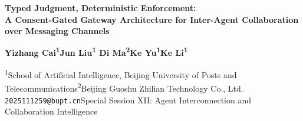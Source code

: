 \documentclass[19pt]{extarticle}
\begin{document}

\vspace*{2mm}
\begin{center}
  {\fontsize{46}{52}\selectfont\bfseries\color{teal}
   Typed Judgment, Deterministic Enforcement:\\[1mm]
   A Consent-Gated Gateway Architecture for Inter-Agent Collaboration over Messaging Channels}

  \vspace{5mm}
  {\Large\color{ink}\bfseries
   Yizhang Cai\textsuperscript{1}\quad Jun Liu\textsuperscript{1}\quad
   Di Ma\textsuperscript{2}\quad Ke Yu\textsuperscript{1}\quad Ke Li\textsuperscript{1}}

  \vspace{3mm}
  \begin{tcolorbox}[enhanced, sharp corners, colback=white, colframe=teal,
    boxrule=0.4pt, width=\textwidth, halign=center,
    borderline={0.4pt}{0pt}{teal,dashed}, fontupper=\normalsize]
    \textsuperscript{1}School of Artificial Intelligence, Beijing University of Posts and
    Telecommunications\quad\textsuperscript{2}Beijing Guoshu Zhilian Technology Co., Ltd.\\
    \texttt{2025111259@bupt.cn}\quad\textbar\quad Special Session XII: Agent Interconnection and
    Collaboration Intelligence
  \end{tcolorbox}
\end{center}

\vspace{2mm}
\end{document}
